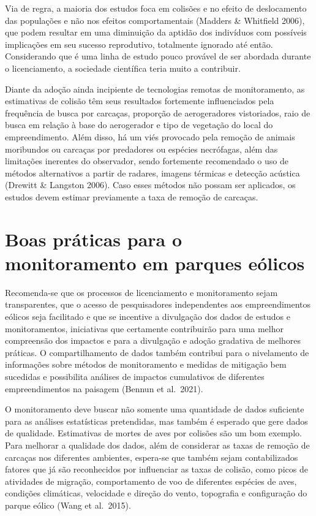 \documentclass[
  oneside]{scrbook}
\begin{document}
Via de regra, a maioria dos estudos foca em colisões e no efeito de deslocamento das populações e não nos efeitos comportamentais (Madders \& Whitfield 2006), que podem resultar em uma diminuição da aptidão dos indivíduos com possíveis implicações em seu sucesso reprodutivo, totalmente ignorado até então. Considerando que é uma linha de estudo pouco provável de ser abordada durante o licenciamento, a sociedade científica teria muito a contribuir.

Diante da adoção ainda incipiente de tecnologias remotas de monitoramento, as estimativas de colisão têm seus resultados fortemente influenciados pela frequência de busca por carcaças, proporção de aerogeradores vistoriados, raio de busca em relação à base do aerogerador e tipo de vegetação do local do empreendimento. Além disso, há um viés provocado pela remoção de animais moribundos ou carcaças por predadores ou espécies necrófagas, além das limitações inerentes do observador, sendo fortemente recomendado o uso de métodos alternativos a partir de radares, imagens térmicas e detecção acústica (Drewitt \& Langston 2006). Caso esses métodos não possam ser aplicados, os estudos devem estimar previamente a taxa de remoção de carcaças.

\hypertarget{boas-pruxe1ticas-para-o-monitoramento-em-parques-euxf3licos}{%
\section{Boas práticas para o monitoramento em parques eólicos}\label{boas-pruxe1ticas-para-o-monitoramento-em-parques-euxf3licos}}

Recomenda-se que os processos de licenciamento e monitoramento sejam transparentes, que o acesso de pesquisadores independentes aos empreendimentos eólicos seja facilitado e que se incentive a divulgação dos dados de estudos e monitoramentos, iniciativas que certamente contribuirão para uma melhor compreensão dos impactos e para a divulgação e adoção gradativa de melhores práticas. O compartilhamento de dados também contribui para o nivelamento de informações sobre métodos de monitoramento e medidas de mitigação bem sucedidas e possibilita análises de impactos cumulativos de diferentes empreendimentos na paisagem (Bennun et al.~2021).

O monitoramento deve buscar não somente uma quantidade de dados suficiente para as análises estatísticas pretendidas, mas também é esperado que gere dados de qualidade. Estimativas de mortes de aves por colisões são um bom exemplo. Para melhorar a qualidade dos dados, além de considerar as taxas de remoção de carcaças nos diferentes ambientes, espera-se que também sejam contabilizados fatores que já são reconhecidos por influenciar as taxas de colisão, como picos de atividades de migração, comportamento de voo de diferentes espécies de aves, condições climáticas, velocidade e direção do vento, topografia e configuração do parque eólico (Wang et al.~2015).
\end{document}
